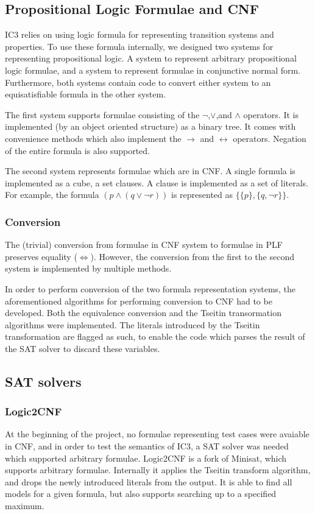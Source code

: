 \documentclass[a4paper]{article}
\begin{document}
\subsection{Propositional Logic Formulae and CNF}
IC3 relies on using logic formula for representing transition systems and properties. To use these formula internally, we designed two systems for representing propositional logic. A system to represent arbitrary propositional logic formulae, and a system to represent formulae in conjunctive normal form. Furthermore, both systems contain code to convert either system to an equisatisfiable formula in the other system.

The first system supports formulae consisting of the $\lnot$,$\lor$,and $\land$ operators. It is implemented (by an object oriented structure) as a binary tree. It comes with convenience methods which also implement the $\rightarrow$ and $\leftrightarrow$ operators. Negation of the entire formula is also supported.

The second system represents formulae which are in CNF. A single formula is implemented as a cube, a set clauses. A clause is implemented as a set of literals. For example, the formula $(p \land (q \lor \lnot r))$ is represented as $\{\{p\},\{q,\lnot r\}\}$.

\subsubsection{Conversion}
The (trivial) conversion from formulae in CNF system to formulae in PLF preserves equality ($\Leftrightarrow$). However, the conversion from the first to the second system is implemented by multiple methods.

In order to perform conversion of the two formula representation systems, the aforementioned algorithms for performing conversion to CNF had to be developed. Both the equivalence conversion and the Tseitin transormation algorithms were implemented.  The literals introduced by the Tseitin transformation are flagged as such, to enable the code which parses the result of the SAT solver to discard these variables.

\subsection{SAT solvers}
\subsubsection{Logic2CNF}
At the beginning of the project, no formulae representing test cases were avaiable in CNF, and in order to test the semantics of IC3, a SAT solver was needed which supported arbitrary formulae. Logic2CNF is a fork of Minisat, which supports arbitrary formulae. Internally it applies the Tseitin transform algorithm, and drops the newly introduced literals from the output. It is able to find all models for a given formula, but also supports searching up to a specified maximum.
\end{document}
